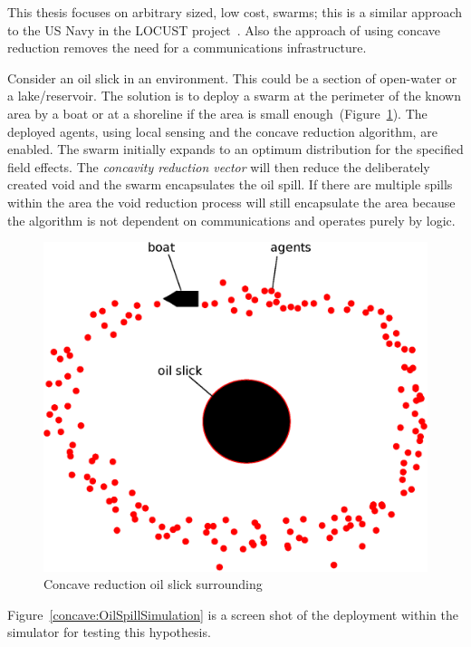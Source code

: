 This thesis focuses on arbitrary sized, low cost, swarms; this is a similar approach to the US Navy in the LOCUST project~\cite{MW:15, DS:15}. Also the approach of using concave reduction removes the need for a communications infrastructure. 

Consider an oil slick in an environment. This could be a section of open-water or a lake/reservoir. The solution is to deploy a swarm at the perimeter of the known area by a boat or at a shoreline if the area is small enough~(Figure~\ref{voids:OilSlick}). The deployed agents, using local sensing and the concave reduction algorithm, are enabled. The swarm initially expands to an optimum distribution for the specified field effects. The \textit{concavity reduction vector} will then reduce the deliberately created void and the swarm encapsulates the oil spill. If there are multiple spills within the area the void reduction process will still encapsulate the area because the algorithm is not dependent on communications and operates purely by logic.  

\begin{figure}[H]
\begin{center}
\includegraphics[width=12cm]{CHAPTER-7/figures/OilSlick}
\end{center}
\caption{Concave reduction oil slick surrounding\label{voids:OilSlick}}
\end{figure}

Figure~\ref{concave:OilSpillSimulation} is a screen shot of the deployment within the simulator for testing this hypothesis. 

